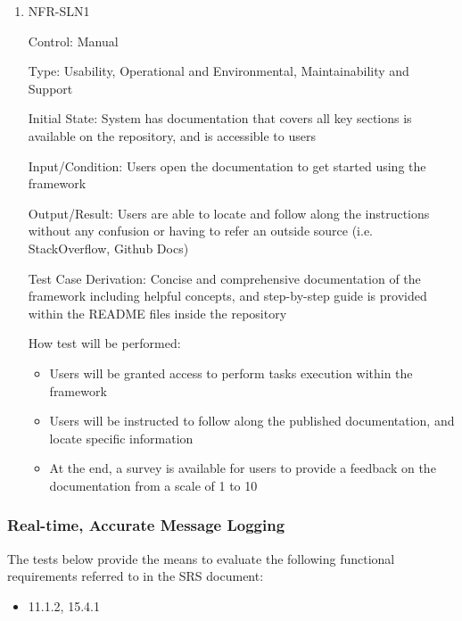 \documentclass[12pt, titlepage]{article}
\begin{document}
\begin{enumerate}

\item{NFR-SLN1}

Control: Manual

Type: Usability, Operational and Environmental, Maintainability and Support
					
Initial State: System has documentation that covers all key sections is available on the repository, and is accessible to users
					
Input/Condition: Users open the documentation to get started using the framework
					
Output/Result: Users are able to locate and follow along the instructions without any confusion or having to refer an outside source (i.e. StackOverflow, Github Docs)

Test Case Derivation: Concise and comprehensive documentation of the framework including helpful concepts, and step-by-step guide is provided within the README files inside the repository

How test will be performed:
  \begin{itemize}
    \item Users will be granted access to perform tasks execution within the framework
    \item Users will be instructed to follow along the published documentation, and locate specific information
    \item At the end, a survey is available for users to provide a feedback on the documentation from a scale of 1 to 10
  \end{itemize}

\end{enumerate}

\subsubsection{Real-time, Accurate Message Logging}

The tests below provide the means to evaluate the following functional requirements referred to in the SRS document:
\begin{itemize}
  \item 11.1.2, 15.4.1
\end{itemize}
\end{document}
